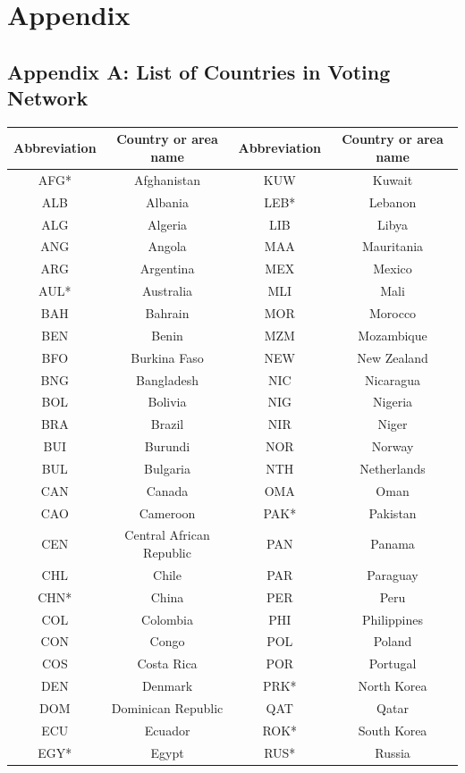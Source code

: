 \documentclass[a4paper]{article}
\begin{document}
\section*{Appendix}
\subsection*{Appendix A: List of Countries in Voting Network}
\begin{table}[H]
	\centering
\begin{tabular}{c|c||c|c}
	\hline
	Abbreviation&Country or area name &	Abbreviation&Country or area name\\
	\hline
			AFG* & Afghanistan & 	KUW & Kuwait\\
				ALB & Albania & LEB* & Lebanon\\
			ALG & Algeria & LIB &Libya \\
		ANG & Angola 	& MAA&  Mauritania\\
		ARG& Argentina	&MEX &Mexico \\
		AUL* & Australia&MLI&Mali\\
		BAH & Bahrain	&MOR & Morocco\\
	BEN & Benin 	&MZM & Mozambique\\
			BFO & Burkina Faso 	&NEW & New Zealand \\
	BNG&  Bangladesh	& NIC& Nicaragua\\
			BOL& Bolivia	& NIG &      Nigeria\\
		BRA &Brazil&NIR & Niger\\
				BUI & Burundi &NOR &Norway \\
		BUL & Bulgaria	&NTH &  Netherlands\\
		CAN & Canada	& OMA & Oman\\
		CAO & Cameroon	&PAK* & Pakistan\\
		CEN & Central African Republic	&PAN & Panama\\
			CHL & Chile &PAR & Paraguay\\
			CHN* & China	& PER & Peru \\
		COL & Colombia	&PHI & Philippines\\
			CON & Congo		&POL & Poland\\
			COS & Costa Rica&POR & Portugal\\
			DEN& Denmark	 & PRK* & North Korea\\
			DOM & Dominican Republic	&QAT & Qatar\\
		ECU &Ecuador 	&ROK* & South Korea\\
			EGY* & Egypt	&RUS* & Russia\\

\end{tabular}
\end{table}
\end{document}
